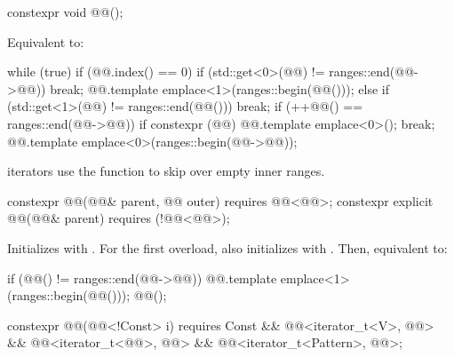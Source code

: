 \begin{itemdecl}
constexpr void @@();
\end{itemdecl}

\begin{itemdescr}
\pnum
\effects
Equivalent to:
\begin{codeblock}
while (true) {
  if (@@.index() == 0) {
    if (std::get<0>(@@) != ranges::end(@@->@@))
      break;
    @@.template emplace<1>(ranges::begin(@@()));
  } else {
    if (std::get<1>(@@) != ranges::end(@@()))
      break;
    if (++@@() == ranges::end(@@->@@)) {
      if constexpr (@@)
        @@.template emplace<0>();
      break;
    }
    @@.template emplace<0>(ranges::begin(@@->@@));
  }
}
\end{codeblock}

\begin{note}
 iterators use the  function
to skip over empty inner ranges.
\end{note}
\end{itemdescr}

\begin{itemdecl}
constexpr @@(@@& parent, @@ outer)
  requires @@<@@>;
constexpr explicit @@(@@& parent)
  requires (!@@<@@>);
\end{itemdecl}

\begin{itemdescr}
\pnum
\effects
Initializes  with .
For the first overload, also initializes
 with .
Then, equivalent to:
\begin{codeblock}
if (@@() != ranges::end(@@->@@)) {
  @@.template emplace<1>(ranges::begin(@@()));
  @@();
}
\end{codeblock}
\end{itemdescr}

\begin{itemdecl}
constexpr @@(@@<!Const> i)
    requires Const && @@<iterator_t<V>, @@> &&
             @@<iterator_t<@@>, @@> &&
             @@<iterator_t<Pattern>, @@>;
\end{itemdecl}

